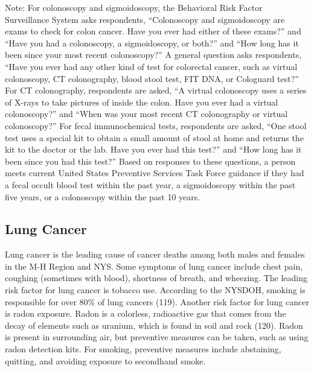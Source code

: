 \documentclass[
  english,
  letterpaper,
]{report}
\begin{document}
\begin{tcolorbox}[enhanced jigsaw, breakable, leftrule=.75mm, title=\textcolor{quarto-callout-note-color}{\faInfo}\hspace{0.5em}{Note}, bottomrule=.15mm, opacityback=0, left=2mm, colback=white, bottomtitle=1mm, coltitle=black, colbacktitle=quarto-callout-note-color!10!white, colframe=quarto-callout-note-color-frame, opacitybacktitle=0.6, toptitle=1mm, titlerule=0mm, arc=.35mm, rightrule=.15mm, toprule=.15mm]

Note: For colonoscopy and sigmoidoscopy, the Behavioral Risk Factor
Surveillance System asks respondents, ``Colonoscopy and sigmoidoscopy
are exams to check for colon cancer. Have you ever had either of these
exams?'' and ``Have you had a colonoscopy, a sigmoidoscopy, or both?''
and ``How long has it been since your most recent colonoscopy?'' A
general question asks respondents, ``Have you ever had any other kind of
test for colorectal cancer, such as virtual colonoscopy, CT
colonography, blood stool test, FIT DNA, or Cologuard test?'' For CT
colonography, respondents are asked, ``A virtual colonoscopy uses a
series of X-rays to take pictures of inside the colon. Have you ever had
a virtual colonoscopy?'' and ``When was your most recent CT colonography
or virtual colonoscopy?'' For fecal immunochemical tests, respondents
are asked, ``One stool test uses a special kit to obtain a small amount
of stool at home and returns the kit to the doctor or the lab. Have you
ever had this test?'' and ``How long has it been since you had this
test?'' Based on responses to these questions, a person meets current
United States Preventive Services Task Force guidance if they had a
fecal occult blood test within the past year, a sigmoidoscopy within the
past five years, or a colonoscopy within the past 10 years.

\end{tcolorbox}

\subsection{Lung Cancer}\label{lung-cancer}

Lung cancer is the leading cause of cancer deaths among both males and
females in the M-H Region and NYS. Some symptoms of lung cancer include
chest pain, coughing (sometimes with blood), shortness of breath, and
wheezing. The leading risk factor for lung cancer is tobacco use.
According to the NYSDOH, smoking is responsible for over 80\% of lung
cancers (119). Another risk factor for lung cancer is radon exposure.
Radon is a colorless, radioactive gas that comes from the decay of
elements such as uranium, which is found in soil and rock (120). Radon
is present in surrounding air, but preventive measures can be taken,
such as using radon detection kits. For smoking, preventive measures
include abstaining, quitting, and avoiding exposure to secondhand smoke.
\end{document}
